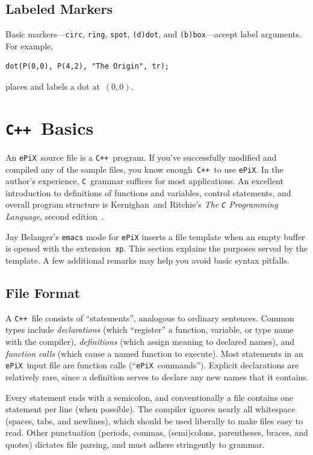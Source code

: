 \documentclass[12pt]{report}
\newcommand{\code}[1]{\texttt{#1}}
\newcommand{\ePiX}{\code{ePiX}}
\newcommand{\CXX}{\code{C++}}
\begin{document}
\subsection*{Labeled Markers}

Basic markers---\code{circ}, \code{ring}, \code{spot}, \code{(d)dot},
and \code{(b)box}---accept label arguments. For example, 
\begin{verbatim}
dot(P(0,0), P(4,2), "The Origin", tr);
\end{verbatim}
places and labels a dot at~$(0,0)$. 


\section{\CXX\ Basics}

An \ePiX\ source file is a \CXX~program. If you've successfully
modified and compiled any of the sample files, you know enough~\CXX\ 
to use \ePiX. In the author's experience, \code{C}~grammar suffices
for most applications.  An excellent introduction to definitions of
functions and variables, control statements, and overall program
structure is Kernighan~and Ritchie's \emph{The \code{C} Programming
  Language}, second edition~\cite{KnR}.

Jay Belanger's \code{emacs} mode for \code{ePiX} inserts a file
template when an empty buffer is opened with the extension~\code{xp}.
This section explains the purposes served by the template. A few
additional remarks may help you avoid basic syntax pitfalls.


\subsection*{File Format}

 A \CXX\ file consists of
``statements'', analogous to ordinary sentences. Common types include
\emph{declarations} (which ``register'' a function, variable, or type
name with the compiler), \emph{definitions} (which assign meaning to
declared names), and \emph{function calls} (which cause a named
function to execute).  Most statements in an \ePiX\ input file are
function calls (``\ePiX\ commands'').  Explicit declarations are
relatively rare, since a definition serves to declare any new names
that it contains.

Every statement ends with a semicolon, and conventionally a file
contains one statement per line (when possible).  The compiler ignores
nearly all whitespace (spaces, tabs, and newlines), which should be
used liberally to make files easy to read.  Other punctuation
(periods, commas, (semi)colons, parentheses, braces, and quotes)
dictates file parsing, and must adhere stringently to grammar.
\end{document}
